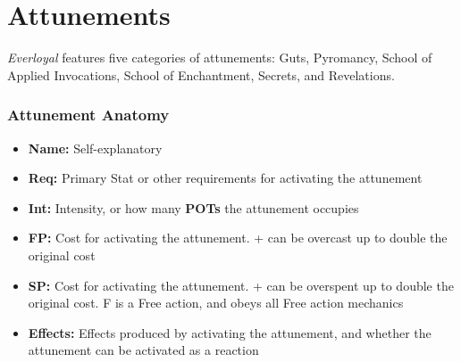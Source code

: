 \section{Attunements}
\emph{Everloyal} features five categories of attunements: Guts, Pyromancy, School of Applied Invocations, School of Enchantment, Secrets, and Revelations.

\subsubsection*{Attunement Anatomy}
\begin{itemize}
\item \textbf{Name:} Self-explanatory
\item \textbf{Req:} Primary Stat or other requirements for activating the attunement
\item \textbf{Int:} Intensity, or how many \textbf{POTs} the attunement occupies 
\item \textbf{FP:} Cost for activating the attunement. + can be overcast up to double the original cost
\item \textbf{SP:} Cost for activating the attunement. + can be overspent up to double the original cost. F is a Free action, and obeys all Free action mechanics
\item \textbf{Effects:} Effects produced by activating the attunement, and whether the attunement can be activated as a reaction
\end{itemize}



\pagebreak



\pagebreak



\pagebreak



\pagebreak



\pagebreak

